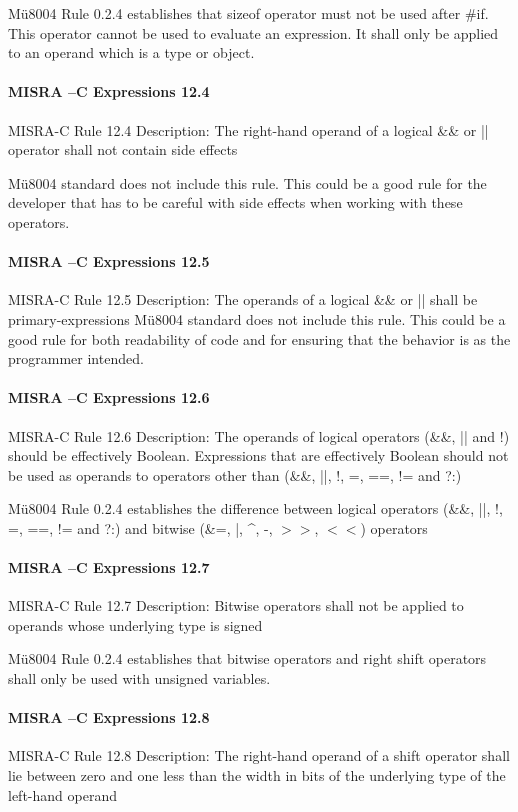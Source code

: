 Mü8004 Rule 0.2.4 establishes that sizeof operator must not be used after \#if. This operator cannot be used to evaluate an expression. It shall only be applied to an operand which is a type or object.

\paragraph{MISRA –C Expressions 12.4}
MISRA-C Rule 12.4 Description: The right-hand operand of a logical \&\& or || operator shall not contain side effects

Mü8004 standard does not include this rule. This could be a good rule for the developer that has to be careful with side effects when working with these operators.

\paragraph{MISRA –C Expressions 12.5}
MISRA-C Rule 12.5 Description: The operands of a logical \&\& or || shall be primary-expressions
Mü8004 standard does not include this rule. This could be a good rule for both readability of code and for ensuring that the behavior is as the programmer intended.

\paragraph{MISRA –C Expressions 12.6}
MISRA-C Rule 12.6 Description: The operands of logical operators (\&\&, || and !) should be effectively Boolean. Expressions that are effectively Boolean should not be used as operands to operators other than (\&\&, ||, !, =, ==, != and ?:)

Mü8004 Rule 0.2.4 establishes the difference between logical operators (\&\&, ||, !, =, ==, != and ?:) and bitwise (\&=, |, \^{}, -, $>>$, $<<$) operators

\paragraph{MISRA –C Expressions 12.7}
MISRA-C Rule 12.7 Description: Bitwise operators shall not be applied to operands whose underlying type is signed

Mü8004 Rule 0.2.4 establishes that bitwise operators and right shift operators shall only be used with unsigned variables.

\paragraph{MISRA –C Expressions 12.8}
MISRA-C Rule 12.8 Description: The right-hand operand of a shift operator shall lie between zero and one less than the width in bits of the underlying type of the left-hand operand

